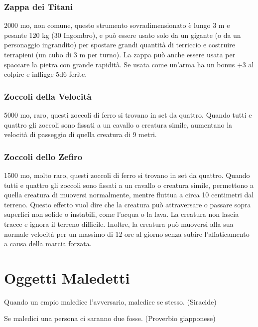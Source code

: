 \begin{multicols}{2}
	\subsubsection*{Zappa dei Titani}
	2000 mo, non comune, questo strumento sovradimensionato è lungo 3 m e pesante 120 kg (30 Ingombro), e può essere usato solo da un gigante (o da un personaggio ingrandito) per spostare grandi quantità di terriccio e costruire terrapieni (un cubo di 3 m per turno). La zappa può anche essere usata per spaccare la pietra con grande rapidità. Se usata come un'arma ha un bonus +3 al colpire e infligge 5d6 ferite.

	\subsubsection*{Zoccoli della Velocità}
	5000 mo, raro, questi zoccoli di ferro si trovano in set da quattro. Quando tutti e quattro gli zoccoli sono fissati a un cavallo o creatura simile, aumentano la velocità di passeggio di quella creatura di 9 metri.

	\subsubsection*{Zoccoli dello Zefiro}
	1500 mo, molto raro, questi zoccoli di ferro si trovano in set da quattro. Quando tutti e quattro gli zoccoli sono fissati a un cavallo o creatura simile, permettono a quella creatura di muoversi normalmente, mentre fluttua a circa 10 centimetri dal terreno. Questo effetto vuol dire che la creatura può attraversare o passare sopra superfici non solide o instabili, come l'acqua o la lava. La creatura non lascia tracce e ignora il terreno difficile. Inoltre, la creatura può muoversi alla sua normale velocità per un massimo di 12 ore al giorno senza subire l'affaticamento a causa della marcia forzata.

\end{multicols}

\pagebreak

\section{Oggetti Maledetti}

\begin{changemargin}{0cm}{0.5cm}\begin{enfasi}{Quando un empio maledice l'avversario, maledice se stesso. (Siracide)

			\medskip

			Se maledici una persona ci saranno due fosse. (Proverbio giapponese)}
\end{enfasi}\end{changemargin}\medskip

